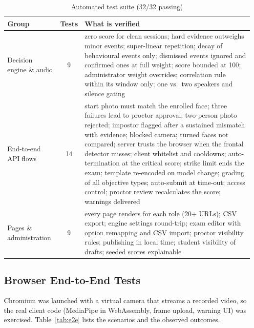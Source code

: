 \documentclass[conference]{IEEEtran}
\begin{document}
\begin{table}[t]
\caption{Automated test suite (32/32 passing)}
\label{tab:tests}
\centering
\footnotesize
\begin{tabular}{@{}p{1.6cm}c p{5.0cm}@{}}
\toprule
\textbf{Group} & \textbf{Tests} & \textbf{What is verified} \\
\midrule
Decision engine \& audio & 9 & zero score for clean sessions; hard evidence outweighs minor events; super-linear repetition; decay of behavioural events only; dismissed events ignored and confirmed ones at full weight; score bounded at 100; administrator weight overrides; correlation rule within its window only; one vs.\ two speakers and silence gating \\
\midrule
End-to-end API flows & 14 & start photo must match the enrolled face; three failures lead to proctor approval; two-person photo rejected; impostor flagged after a sustained mismatch with evidence; blocked camera; turned faces not compared; server trusts the browser when the frontal detector misses; client whitelist and cooldowns; auto-termination at the critical score; strike limit ends the exam; template re-encoded on model change; grading of all objective types; auto-submit at time-out; access control; proctor review recalculates the score; warnings delivered \\
\midrule
Pages \& administration & 9 & every page renders for each role (20+ URLs); CSV export; engine settings round-trip; exam editor with option remapping and CSV import; proctor visibility rules; publishing in local time; student visibility of drafts; seeded scores explainable \\
\bottomrule
\end{tabular}
\end{table}

\subsection{Browser End-to-End Tests}
Chromium was launched with a virtual camera that streams a recorded video, so the real client code (MediaPipe in WebAssembly, frame upload, warning UI) was exercised. Table~\ref{tab:e2e} lists the scenarios and the observed outcomes.
\end{document}
